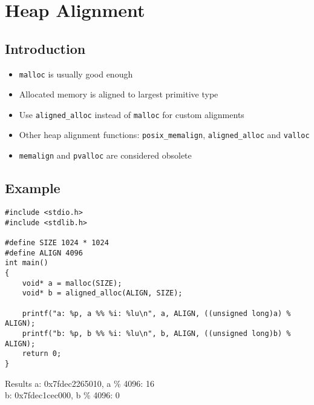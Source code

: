 \documentclass{beamer}
\begin{document}
\section{Heap Alignment}
\subsection{Introduction}
\begin{frame}[fragile]{\insertsection}{\insertsubsection}
    \pause
    \begin{itemize}
        \item \verb|malloc| is usually good enough
        \item Allocated memory is aligned to largest primitive type\pause
        \item Use \verb|aligned_alloc| instead of \verb|malloc| for custom alignments
        \item Other heap alignment functions: \verb|posix_memalign|, \verb|aligned_alloc| and \verb|valloc|\pause
        \item \verb|memalign| and \verb|pvalloc| are considered obsolete
    \end{itemize}
\end{frame}

\subsection{Example}
\begin{frame}[fragile]{\insertsection}{\insertsubsection}
    \begin{verbatim}
#include <stdio.h>
#include <stdlib.h>

#define SIZE 1024 * 1024
#define ALIGN 4096
int main()
{
    void* a = malloc(SIZE);
    void* b = aligned_alloc(ALIGN, SIZE);
    
    printf("a: %p, a %% %i: %lu\n", a, ALIGN, ((unsigned long)a) % ALIGN);
    printf("b: %p, b %% %i: %lu\n", b, ALIGN, ((unsigned long)b) % ALIGN);
    return 0;
}
    \end{verbatim}
    \begin{block}{Results}
        a: 0x7fdec2265010, a \% 4096: 16\\
        b: 0x7fdec1cec000, b \% 4096: 0
    \end{block}
\end{frame}
\end{document}
